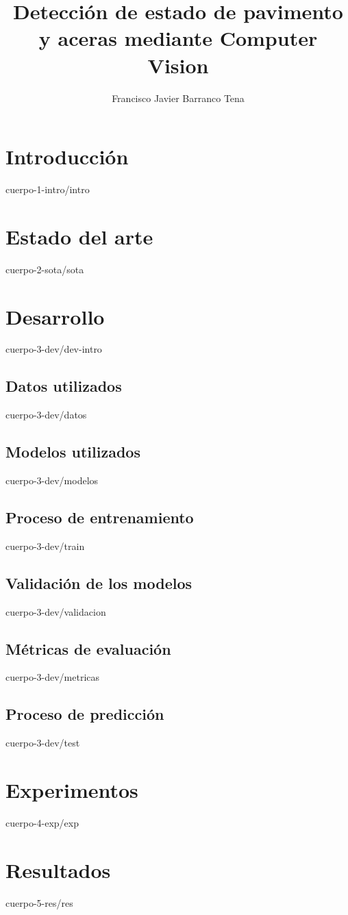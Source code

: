 \documentclass[epsbased,copyright,final,printable,covers,extendedindex,firstnumbered,tfg,gnuplot]{tfgtfmthesisuam}
\title{Detección de estado de pavimento y aceras mediante Computer Vision}
\subtitle{}
\author{Francisco Javier Barranco Tena}
\begin{document}
\chapter{Introducción\label{CAP:INTRO}}{cuerpo-1-intro/intro}

\chapter{Estado del arte\label{CAP:SOTA}}{cuerpo-2-sota/sota}

\chapter{Desarrollo\label{CAP:DEV}}{cuerpo-3-dev/dev-intro}
  \section{Datos utilizados\label{SEC:DATOS}}{cuerpo-3-dev/datos}
  \section{Modelos utilizados\label{SEC:MODELOS}}{cuerpo-3-dev/modelos}
  \section{Proceso de entrenamiento\label{SEC:TRAIN}}{cuerpo-3-dev/train}
  \section{Validación de los modelos\label{SEC:VALIDACION}}{cuerpo-3-dev/validacion}
  \section{Métricas de evaluación\label{SEC:METRICAS}}{cuerpo-3-dev/metricas}
  \section{Proceso de predicción\label{SEC:PRED}}{cuerpo-3-dev/test}
  
\chapter{Experimentos\label{CAP:EXP}}{cuerpo-4-exp/exp}

\chapter{Resultados\label{CAP:RES}}{cuerpo-5-res/res}
\end{document}
